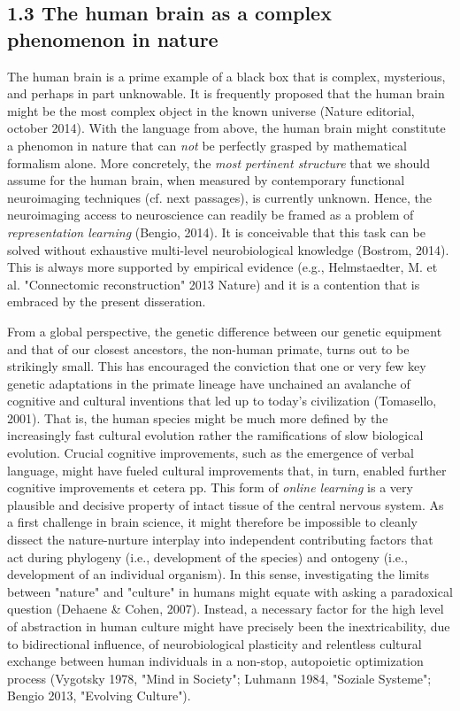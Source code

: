\documentclass[authoryear,review,3p]{elsarticle}
\begin{document}
\subsection*{1.3 The human brain as a complex phenomenon in nature}
The human brain is a prime example of
a black box that is complex, mysterious, and perhaps in part unknowable.
It is frequently proposed that
the human brain might be the most complex object in the known universe
(Nature editorial, october 2014).
With the language from above,
the human brain might constitute a phenomon in nature that
can \textit{not} be perfectly grasped by mathematical formalism alone.
More concretely,
the \textit{most pertinent structure}
that we should assume for the human brain,
when measured by
contemporary functional neuroimaging techniques (cf. next passages),
is currently unknown.
Hence, the neuroimaging access to neuroscience can readily be framed as
a problem of \textit{representation learning} (Bengio, 2014).
It is conceivable
that this task can be solved without exhaustive
multi-level neurobiological knowledge (Bostrom, 2014).
This is always more supported by empirical evidence
(e.g., Helmstaedter, M. et al. "Connectomic reconstruction" 2013 Nature)
and
it is a contention that is embraced by the present disseration.


From a global perspective,
the genetic difference between our genetic equipment and that
of our closest ancestors, the non-human primate, turns out to be 
strikingly small.
This has encouraged the conviction that one or very few key genetic
adaptations in the primate lineage have unchained an avalanche
of cognitive and cultural inventions that led up to today's civilization
(Tomasello, 2001).
That is, the human species might be much more defined by the
increasingly fast cultural evolution rather the ramifications
of slow biological evolution.
Crucial cognitive improvements,
such as the emergence of verbal language, 
might have fueled cultural improvements that, in turn, enabled
further cognitive improvements et cetera pp.
This form of \textit{online learning} is a very plausible and decisive
property of intact tissue of the central nervous system.
%
As a first challenge in brain science,
it might therefore be impossible to cleanly dissect
the nature-nurture interplay into independent contributing factors that act
during
phylogeny (i.e., development of the species)
and
ontogeny (i.e., development of an individual organism).
%
In this sense,
investigating the limits between "nature" and "culture" in humans
might equate with asking a paradoxical question
(Dehaene \& Cohen, 2007).
%
Instead,
a necessary factor for the high level of abstraction in human culture
might have precisely been the inextricability, due to bidirectional influence, of
neurobiological plasticity and relentless cultural exchange
between human individuals
in a non-stop, autopoietic optimization process
(Vygotsky 1978, "Mind in Society"; Luhmann 1984, "Soziale Systeme";
Bengio 2013, "Evolving Culture").
\end{document}
